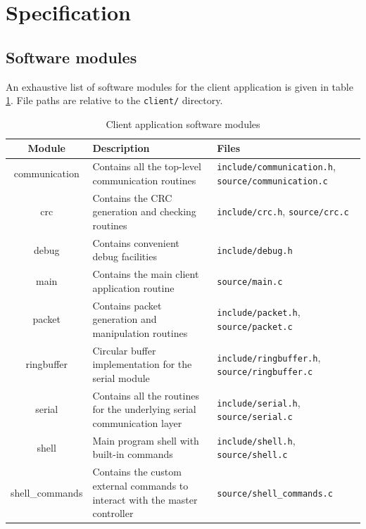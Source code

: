 \documentclass[binding=0.6cm,Lau]{sapthesis}
\begin{document}
\section{Specification}

\subsection{Software modules}
An exhaustive list of software modules for the client application is given
in table \ref{tab:client-spec-modules}. File paths are relative to the
\texttt{client/} directory.

\begin{table}[bh]
  \begin{tabularx}{\textwidth}{c X X}
    \toprule
    Module & Description & Files \\
    \midrule
    communication &
      Contains all the top-level communication routines &
      \texttt{include/communication.h}, \texttt{source/communication.c} \\
    crc &
      Contains the CRC generation and checking routines &
      \texttt{include/crc.h}, \texttt{source/crc.c} \\
    debug &
      Contains convenient debug facilities &
      \texttt{include/debug.h} \\
    main &
      Contains the main client application routine &
      \texttt{source/main.c} \\
    packet &
      Contains packet generation and manipulation routines &
      \texttt{include/packet.h}, \texttt{source/packet.c} \\
    ringbuffer &
      Circular buffer implementation for the serial module &
      \texttt{include/ringbuffer.h}, \texttt{source/ringbuffer.c} \\
    serial &
      Contains all the routines for the underlying serial communication layer &
      \texttt{include/serial.h}, \texttt{source/serial.c} \\
    shell &
      Main program shell with built-in commands &
      \texttt{include/shell.h}, \texttt{source/shell.c} \\
    shell\_commands &
      Contains the custom external commands to interact with the master controller &
      \texttt{source/shell\_commands.c} \\
    \bottomrule
  \end{tabularx}
  \caption{Client application software modules}
  \label{tab:client-spec-modules}
\end{table}
\end{document}
